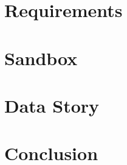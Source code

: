 \documentclass[12pt, letterpaper, twoside]{article}
\begin{document}
\section{Requirements}


\section{Sandbox}

\section{Data Story}

\section{Conclusion}
\end{document}
